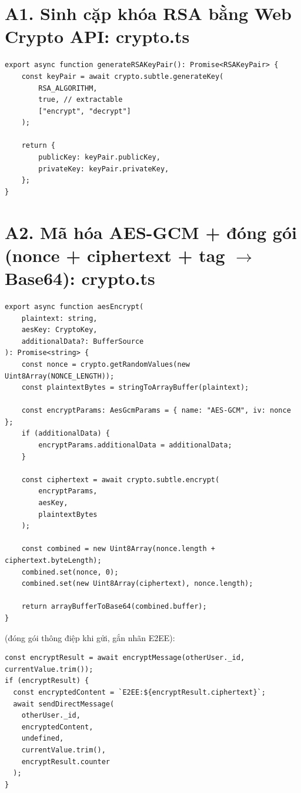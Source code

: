 

\section*{A1. Sinh cặp khóa RSA bằng Web Crypto API: crypto.ts}

\begin{verbatim}
export async function generateRSAKeyPair(): Promise<RSAKeyPair> {
    const keyPair = await crypto.subtle.generateKey(
        RSA_ALGORITHM,
        true, // extractable
        ["encrypt", "decrypt"]
    );

    return {
        publicKey: keyPair.publicKey,
        privateKey: keyPair.privateKey,
    };
}
\end{verbatim}

\section*{A2. Mã hóa AES-GCM + đóng gói (nonce + ciphertext + tag $\to$ Base64): crypto.ts}

\begin{verbatim}
export async function aesEncrypt(
    plaintext: string,
    aesKey: CryptoKey,
    additionalData?: BufferSource
): Promise<string> {
    const nonce = crypto.getRandomValues(new Uint8Array(NONCE_LENGTH));
    const plaintextBytes = stringToArrayBuffer(plaintext);

    const encryptParams: AesGcmParams = { name: "AES-GCM", iv: nonce };
    if (additionalData) {
        encryptParams.additionalData = additionalData;
    }

    const ciphertext = await crypto.subtle.encrypt(
        encryptParams,
        aesKey,
        plaintextBytes
    );

    const combined = new Uint8Array(nonce.length + ciphertext.byteLength);
    combined.set(nonce, 0);
    combined.set(new Uint8Array(ciphertext), nonce.length);

    return arrayBufferToBase64(combined.buffer);
}
\end{verbatim}

\noindent (đóng gói thông điệp khi gửi, gắn nhãn E2EE):

\begin{verbatim}
const encryptResult = await encryptMessage(otherUser._id, currentValue.trim());
if (encryptResult) {
  const encryptedContent = `E2EE:${encryptResult.ciphertext}`;
  await sendDirectMessage(
    otherUser._id,
    encryptedContent,
    undefined,
    currentValue.trim(),
    encryptResult.counter
  );
}
\end{verbatim}

